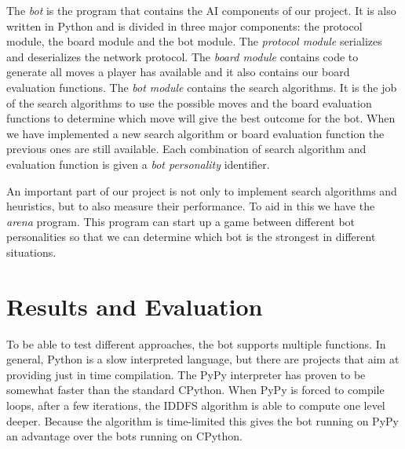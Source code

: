 \documentclass[a4paper,11pt]{article}
\begin{document}
The \emph{bot} is the program that contains the AI components of our
project. It is also written in Python and is divided in three major
components: the protocol module, the board module and the bot module.
The \emph{protocol module} serializes and deserializes the network protocol.
The \emph{board module} contains code to generate all moves a player has
available and it also contains our board evaluation functions. The
\emph{bot module} contains the search algorithms. It is the job of the search
algorithms to use the possible moves and the board evaluation
functions to determine which move will give the best outcome for the
bot. When we have implemented a new search algorithm or board
evaluation function the previous ones are still available. Each
combination of search algorithm and evaluation function is given a
\emph{bot personality} identifier.

An important part of our project is not only to implement search
algorithms and heuristics, but to also measure their performance. To
aid in this we have the \emph{arena} program. This program can start
up a game between different bot personalities so that we can determine
which bot is the strongest in different situations.



\section{Results and Evaluation}

To be able to test different approaches, the bot supports multiple
functions. In general, Python is a slow interpreted language, but
there are projects that aim at providing just in time compilation. The
PyPy interpreter has proven to be somewhat faster than the standard
CPython. When PyPy is forced to compile loops, after a few iterations,
the IDDFS algorithm is able to compute one level deeper. Because the
algorithm is time-limited this gives the bot running on PyPy an
advantage over the bots running on CPython.
\end{document}
